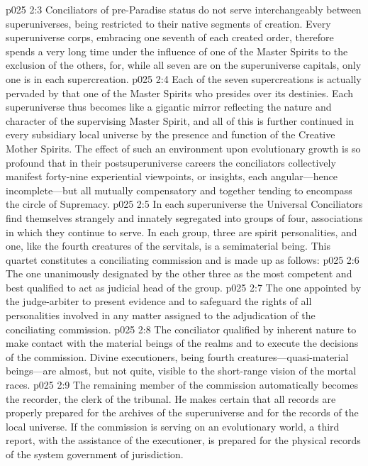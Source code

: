 \vs p025 2:3 Conciliators of pre\hyp{}Paradise status do not serve interchangeably between superuniverses, being restricted to their native segments of creation. Every superuniverse corps, embracing one seventh of each created order, therefore spends a very long time under the influence of one of the Master Spirits to the exclusion of the others, for, while all seven are  on the superuniverse capitals, only one is  in each supercreation.
\vs p025 2:4 Each of the seven supercreations is actually pervaded by that one of the Master Spirits who presides over its destinies. Each superuniverse thus becomes like a gigantic mirror reflecting the nature and character of the supervising Master Spirit, and all of this is further continued in every subsidiary local universe by the presence and function of the Creative Mother Spirits. The effect of such an environment upon evolutionary growth is so profound that in their postsuperuniverse careers the conciliators collectively manifest forty\hyp{}nine experiential viewpoints, or insights, each angular---hence incomplete---but all mutually compensatory and together tending to encompass the circle of Supremacy.
\pc \vs p025 2:5 In each superuniverse the Universal Conciliators find themselves strangely and innately segregated into groups of four, associations in which they continue to serve. In each group, three are spirit personalities, and one, like the fourth creatures of the servitals, is a semimaterial being. This quartet constitutes a conciliating commission and is made up as follows:\plusone
\pc \vs p025 2:6 \bibnobreakspace {} The one unanimously designated by the other three as the most competent and best qualified to act as judicial head of the group.
\pc \vs p025 2:7 \bibnobreakspace {} The one appointed by the judge\hyp{}arbiter to present evidence and to safeguard the rights of all personalities involved in any matter assigned to the adjudication of the conciliating commission.
\pc \vs p025 2:8 \bibnobreakspace {} The conciliator qualified by inherent nature to make contact with the material beings of the realms and to execute the decisions of the commission. Divine executioners, being fourth creatures---quasi\hyp{}material beings---are almost, but not quite, visible to the short\hyp{}range vision of the mortal races.
\pc \vs p025 2:9 \bibnobreakspace {} The remaining member of the commission automatically becomes the recorder, the clerk of the tribunal. He makes certain that all records are properly prepared for the archives of the superuniverse and for the records of the local universe. If the commission is serving on an evolutionary world, a third report, with the assistance of the executioner, is prepared for the physical records of the system government of jurisdiction.
